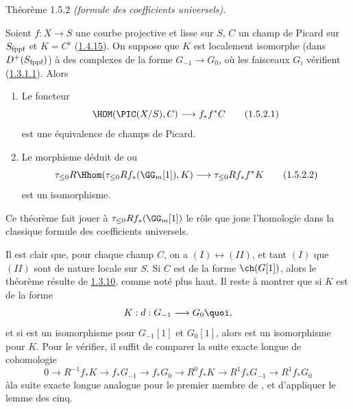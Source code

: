 \begin{enonce*}{Théorème 1.5.2}
\emph{(formule des coefficients universels).}

Soient $f:X\rightarrow S$ une courbe projective et lisse sur $S$, $C$
un champ de Picard sur $S_{\text{\rm fppf}}$ et $K=C^{\flat}$
(\hyperref[XVIII.prop1.4.15]{1.4.15}). On suppose que $K$ est localement isomorphe (dans
$D^{+}(S_{\text{\rm fppf}})$) à des complexes de la forme
$G_{-1}\rightarrow G_{0}$, où les faisceaux $G_{i}$ vérifient
(\hyperref[XVIII.par1.3.1.1]{1.3.1.1}). Alors
\begin{enumerate}
\renewcommand{\theenumi}{\Roman{enumi}}
\renewcommand{\labelenumi}{(\theenumi)}
\item Le foncteur 
\begin{equation*}
\HOM(\PIC(X/S),C)\longrightarrow f_{\ast}f^{\ast}C\tag{1.5.2.1}
\end{equation*}%
est une équivalence de champs de Picard.

\item Le morphisme déduit de  ou 
\begin{equation*}
\tau_{\leq 0}R\Hhom(\tau_{\leq 0}
Rf_{\ast}(\GG_{m}[1]),K)\longrightarrow \tau_{\leq 0}
Rf_{\ast}f^{\ast}K\tag{1.5.2.2}
\end{equation*}%
est un isomorphisme.
\end{enumerate}
\end{enonce*}

Ce théorème fait jouer à $\tau_{\leq 0}Rf_{\ast}(\GG_{m}[1])$
le rôle que joue l'homologie dans la classique formule des
coefficients universels.

Il est clair que, pour chaque champ $C$, on a $(I)\leftrightarrow
(II)$, et tant $(I)$ que $(II)$ sont de nature locale sur $S$. Si $C$
est de la forme $\ch(G[1])$, alors le théorème résulte de
\hyperref[XVIII.thm1.3.10]{1.3.10}, 
comme noté plus haut. Il reste à montrer que si $K$ est de la forme
$$
K:d:G_{-1}\longrightarrow G_{0}{\quoi},
$$
et si  est un isomorphisme pour $G_{-1}[1]$ et $G_{0}[1]$,
alors  est un isomorphisme pour $K$. Pour le vérifier, il
suffit de comparer la suite exacte longue de cohomologie
$$
0\longrightarrow R^{-1}f_{\ast}K\longrightarrow
f_{\ast}G_{-1}\longrightarrow f_{\ast}G_{0}\longrightarrow
R^{0}f_{\ast}K\longrightarrow R^{1} f_{\ast}G_{-1}\longrightarrow
R^{1}f_{\ast}G_{0}
$$
à\pageoriginale la suite exacte longue analogue pour le premier membre
de , et d'appliquer le lemme des cinq.

